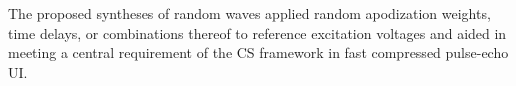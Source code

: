 The proposed syntheses of
random waves applied
random apodization weights,
time delays, or
combinations thereof to
reference excitation voltages and aided in meeting
a central requirement of
the \ac{CS} framework in
fast compressed pulse-echo \ac{UI}.
